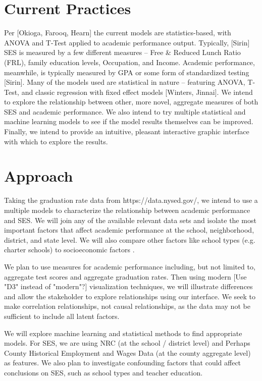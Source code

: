 \documentclass[sigconf,nonacm,11pt]{acmart}
\begin{document}
\section{Current Practices}
Per [Okioga, Farooq, Hearn] the current models are statistics-based, with ANOVA and T-Test applied to academic performance output. Typically, [Sirin] SES is measured by a few different measures -- Free \& Reduced Lunch Ratio (FRL), family education levels, Occupation, and Income.  Academic performance, meanwhile, is typically measured by GPA or some form of standardized testing [Sirin].  Many of the models used are statistical in nature -- featuring ANOVA, T-Test, and classic regression with fixed effect models [Winters, Jinnai]. We intend to explore the relationship between other, more novel, aggregate measures of both SES and academic performance.  We also intend to try multiple statistical and machine learning models to see if the model results themselves can be improved. Finally, we intend to provide an intuitive, pleasant interactive graphic interface with which to explore the results.

\section{Approach}
Taking the graduation rate data from https://data.nysed.gov/, we intend to use a multiple models to characterize the relationship between academic performance and SES.  We will join any of the available relevant data sets and isolate the most important factors that affect academic performance at the school, neighborhood, district, and state level. We will also compare other factors like school types (e.g. charter schools) to socioeconomic factors .

We plan to use measures for academic performance including, but not limited to, aggregate test scores and aggregate graduation rates.  Then using modern [Use "D3" instead of "modern"?] visualization techniques, we will illustrate differences and allow the stakeholder to explore relationships using our interface. We seek to make correlation relationships, not causal relationships, as the data may not be sufficient to include all latent factors.

We will explore machine learning and statistical methods to find appropriate models.  For SES, we are using NRC (at the school / district level) and Perhaps County Historical Employment and Wages Data (at the county aggregate level) as features. We also plan to investigate confounding factors that could affect conclusions on SES, such as school types and teacher education.
\end{document}
